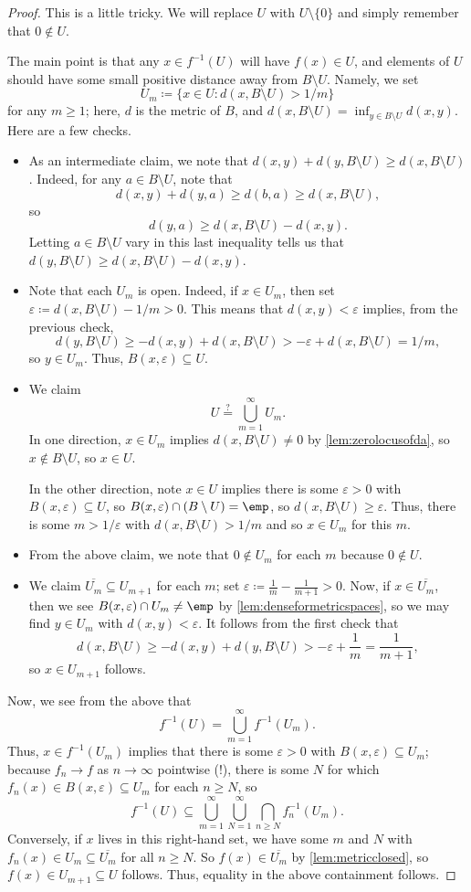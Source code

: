 \documentclass[../notes.tex]{subfiles}
\begin{document}
\begin{proof}
	This is a little tricky. We will replace $U$ with $U\setminus\{0\}$ and simply remember that $0\notin U$.
	
	The main point is that any $x\in f^{-1}(U)$ will have $f(x)\in U$, and elements of $U$ should have some small positive distance away from $B\setminus U$. Namely, we set
	\[U_m\coloneqq\{x\in U:d(x,B\setminus U)>1/m\}\]
	for any $m\ge1$; here, $d$ is the metric of $B$, and $d(x,B\setminus U)=\inf_{y\in B\setminus U}d(x,y)$. Here are a few checks.
	\begin{itemize}
		\item As an intermediate claim, we note that $d(x,y)+d(y,B\setminus U)\ge d(x,B\setminus U)$. Indeed, for any $a\in B\setminus U$, note that
		\[d(x,y)+d(y,a)\ge d(b,a)\ge d(x,B\setminus U),\]
		so
		\[d(y,a)\ge d(x,B\setminus U)-d(x,y).\]
		Letting $a\in B\setminus U$ vary in this last inequality tells us that $d(y,B\setminus U)\ge d(x,B\setminus U)-d(x,y)$.
		\item Note that each $U_m$ is open. Indeed, if $x\in U_m$, then set $\varepsilon\coloneqq d(x,B\setminus U)-1/m>0$. This means that $d(x,y)<\varepsilon$ implies, from the previous check,
		\[d(y,B\setminus U)\ge-d(x,y)+d(x,B\setminus U)>-\varepsilon+d(x,B\setminus U)=1/m,\]
		so $y\in U_m$. Thus, $B(x,\varepsilon)\subseteq U$.
		\item We claim
		\[U\stackrel?=\bigcup_{m=1}^\infty U_m.\]
		In one direction, $x\in U_m$ implies $d(x,B\setminus U)\ne0$ by \autoref{lem:zerolocusofda}, so $x\notin B\setminus U$, so $x\in U$.
		
		In the other direction, note $x\in U$ implies there is some $\varepsilon>0$ with $B(x,\varepsilon)\subseteq U$, so $B(x,\varepsilon)\cap(B\setminus U)=\emp$, so $d(x,B\setminus U)\ge\varepsilon$. Thus, there is some $m>1/\varepsilon$ with $d(x,B\setminus U)>1/m$ and so $x\in U_m$ for this $m$.
		\item From the above claim, we note that $0\notin U_m$ for each $m$ because $0\notin U$.
		\item We claim $\overline{U_m}\subseteq U_{m+1}$ for each $m$; set $\varepsilon\coloneqq\frac1m-\frac1{m+1}>0$. Now, if $x\in\overline{U_m}$, then we see $B(x,\varepsilon)\cap U_m\ne\emp$ by \autoref{lem:denseformetricspaces}, so we may find $y\in U_m$ with $d(x,y)<\varepsilon$. It follows from the first check that
		\[d(x,B\setminus U)\ge-d(x,y)+d(y,B\setminus U)>-\varepsilon+\frac1m=\frac1{m+1},\]
		so $x\in U_{m+1}$ follows.
	\end{itemize}
	Now, we see from the above that
	\[f^{-1}(U)=\bigcup_{m=1}^\infty f^{-1}(U_m).\]
	Thus, $x\in f^{-1}(U_m)$ implies that there is some $\varepsilon>0$ with $B(x,\varepsilon)\subseteq U_m$; because $f_n\to f$ as $n\to\infty$ pointwise (!), there is some $N$ for which $f_n(x)\in B(x,\varepsilon)\subseteq U_m$ for each $n\ge N$, so
	\[f^{-1}(U)\subseteq\bigcup_{m=1}^\infty\bigcup_{N=1}^\infty\bigcap_{n\ge N}f_n^{-1}(U_m).\]
	Conversely, if $x$ lives in this right-hand set, we have some $m$ and $N$ with $f_n(x)\in U_m\subseteq\overline{U_m}$ for all $n\ge N$. So $f(x)\in\overline{U_m}$ by \autoref{lem:metricclosed}, so $f(x)\in U_{m+1}\subseteq U$ follows. Thus, equality in the above containment follows.


\end{proof}
\end{document}
